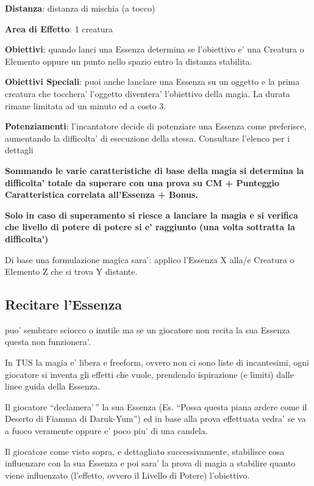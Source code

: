 \documentclass[a4paper,11pt,twoside,openany]{dndbook}
\begin{document}
\textbf{Distanza}: distanza di mischia (a tocco)

\textbf{Area di Effetto}: 1 creatura 

\textbf{Obiettivi}: quando lanci una Essenza determina se l'obiettivo e' una Creatura o Elemento oppure un punto nello spazio entro la distanza stabilita.

\textbf{Obiettivi Speciali}: puoi anche lanciare una Essenza su un oggetto e la prima creatura che tocchera' l'oggetto diventera' l'obiettivo della magia. La durata rimane limitata ad un minuto ed a costo 3.

\textbf{Potenziamenti}: l'incantatore decide di potenziare una Essenza come preferisce, aumentando la difficolta' di esecuzione della stessa. Consultare l'elenco per i dettagli

\textbf{Sommando le varie caratteristiche di base della magia si determina la difficolta' totale da superare con una prova su CM + Punteggio Caratteristica correlata all'Essenza + Bonus.}

\textbf{Solo in caso di superamento si riesce a lanciare la magia e si verifica che livello di potere di potere si e' raggiunto (una volta sottratta la difficolta')}

Di base una formulazione magica sara': applico l'Essenza X alla/e Creatura o Elemento Z che si trova Y distante.

\subsection{Recitare l'Essenza}

\label{recitare-lessenza}

puo' sembrare sciocco o inutile ma se un giocatore non recita la sua Essenza questa non funzionera'.

In TUS la magia e' libera e freeform, ovvero non ci sono liste di incantesimi, ogni giocatore si inventa gli effetti che vuole, prendendo ispirazione (e limiti) dalle linee guida della Essenza.

Il giocatore ``declamera'\,'' la sua Essenza (Es. ``Possa questa piana ardere come il Deserto di Fiamma di Daruk-Yum'') ed in base alla prova effettuata vedra' se va a fuoco veramente oppure e' poco piu' di una candela.

Il giocatore come visto sopra, e dettagliato successivamente, stabilisce cosa influenzare con la sua Essenza e poi sara' la prova di magia a stabilire quanto viene influenzato (l'effetto, ovvero il Livello di Potere) l'obiettivo.
\end{document}
